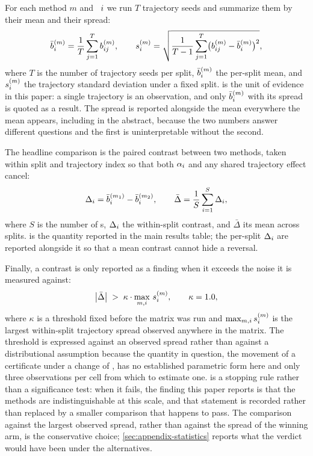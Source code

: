 For each method $m$ and \splitseed\ $i$ we run $T$ trajectory seeds and
summarize them by their mean and their spread:
\begin{equation}\label{eq:persplit}
  \bar{b}^{(m)}_{i} = \frac{1}{T}\sum_{j=1}^{T}
    b^{(m)}_{ij},
  \qquad
  s^{(m)}_{i} = \sqrt{\frac{1}{T-1}\sum_{j=1}^{T}
    \bigl(b^{(m)}_{ij} - \bar{b}^{(m)}_{i}\bigr)^2},
\end{equation}
where $T$ is the number of trajectory seeds per split,
$\bar{b}^{(m)}_{i}$ the per-split mean, and $s^{(m)}_{i}$ the
trajectory standard deviation under a fixed split.  is the
unit of evidence in this paper: a single trajectory is an observation, and only
$\bar{b}^{(m)}_{i}$ with its spread is quoted as a result. The spread
is reported alongside the mean everywhere the mean appears, including in the
abstract, because the two numbers answer different questions and the first is
uninterpretable without the second.

The headline comparison is the paired contrast between two methods, taken within
split and trajectory index so that both $\alpha_{i}$ and any shared
trajectory effect cancel:
\begin{equation}\label{eq:contrast}
  \Delta_{i} = \bar{b}^{(m_1)}_{i} - \bar{b}^{(m_2)}_{i},
  \qquad
  \bar{\Delta} = \frac{1}{S}\sum_{i=1}^{S} \Delta_{i},
\end{equation}
where $S$ is the number of \splitseed{}s, $\Delta_{i}$ the within-split
contrast, and $\bar{\Delta}$ its mean across splits.  is the
quantity reported in the main results table; the per-split $\Delta_{i}$
are reported alongside it so that a mean contrast cannot hide a reversal.

Finally, a contrast is only reported as a finding when it exceeds the noise it is
measured against:
\begin{equation}\label{eq:decision}
  \bigl|\bar{\Delta}\bigr| \;>\; \kappa \cdot
  \max_{m,i}\, s^{(m)}_{i},
  \qquad \kappa = 1.0,
\end{equation}
where $\kappa$ is a threshold fixed before the matrix was run and
$\max_{m,i} s^{(m)}_{i}$ is the largest within-split trajectory
spread observed anywhere in the matrix. The threshold is expressed against an observed spread rather than against a
distributional assumption because the quantity in question, the movement of a
certificate under a change of \trajseed, has no established parametric form here
and only three observations per cell from which to estimate one.
 is a stopping rule rather than a significance test: when it fails, the finding this paper reports is
that the methods are indistinguishable at this scale, and that statement is
recorded rather than replaced by a smaller comparison that happens to pass. The
comparison against the largest observed spread, rather than against the spread of
the winning arm, is the conservative choice; \cref{sec:appendix-statistics}
reports what the verdict would have been under the alternatives.

